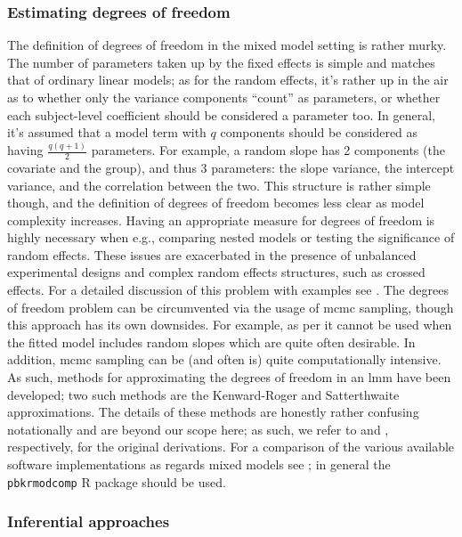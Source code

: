 \documentclass{report}
\begin{document}
\subsubsection{Estimating degrees of freedom}

The definition of degrees of freedom in the mixed model setting is rather murky. The number of parameters taken up by the fixed effects is simple and matches that of ordinary linear models; as for the random effects, it's rather up in the air as to whether only the variance components ``count'' as parameters, or whether each subject-level coefficient should be considered a parameter too. In general, it's assumed that a model term with $q$ components should be considered as having $\frac{q(q+1)}{2}$ parameters. For example, a random slope has 2 components (the covariate and the group), and thus 3 parameters: the slope variance, the intercept variance, and the correlation between the two. This structure is rather simple though, and the definition of degrees of freedom becomes less clear as model complexity increases. Having an appropriate measure for degrees of freedom is highly necessary when e.g., comparing nested models or testing the significance of random effects. These issues are exacerbated in the presence of unbalanced experimental designs and complex random effects structures, such as crossed effects. For a detailed discussion of this problem with examples see \cite{baayen_mixed-effects_2008}. The degrees of freedom problem can be circumvented via the usage of \gls{mcmc} sampling, though this approach has its own downsides. For example, as per \cite{luke_evaluating_2017} it cannot be used when the fitted model includes random slopes which are quite often desirable. In addition, \gls{mcmc} sampling can be (and often is) quite computationally intensive. As such, methods for approximating the degrees of freedom in an \gls{lmm} have been developed; two such methods are the Kenward-Roger and Satterthwaite approximations. The details of these methods are honestly rather confusing notationally and are beyond our scope here; as such, we refer to \cite{kenward_small_1997} and \cite{satterthwaite_approximate_1946}, respectively, for the original derivations. For a comparison of the various available software implementations as regards mixed models see \cite{luke_evaluating_2017}; in general the \texttt{pbkrmodcomp} R package should be used. 

\subsubsection{Inferential approaches}
\end{document}
